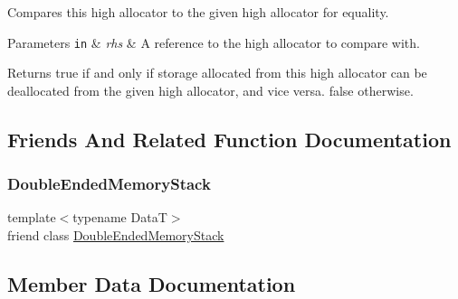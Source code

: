 Compares this high allocator to the given high allocator for equality.


\begin{DoxyParams}[1]{Parameters}
\mbox{\tt in}  & {\em rhs} & A reference to the high allocator to compare with. \\
\hline
\end{DoxyParams}
\begin{DoxyReturn}{Returns}
{\ttfamily true} if and only if storage allocated from this high allocator can be deallocated from the given high allocator, and vice versa. {\ttfamily false} otherwise. 
\end{DoxyReturn}


\subsection{Friends And Related Function Documentation}
\hypertarget{structmage_1_1_double_ended_memory_stack_1_1_high_allocator_a10ae729d55b8c0017057250445835680}{}\label{structmage_1_1_double_ended_memory_stack_1_1_high_allocator_a10ae729d55b8c0017057250445835680} 
\subsubsection{\texorpdfstring{Double\+Ended\+Memory\+Stack}{DoubleEndedMemoryStack}}
{\footnotesize\ttfamily template$<$typename DataT$>$ \\
friend class \hyperlink{classmage_1_1_double_ended_memory_stack}{Double\+Ended\+Memory\+Stack}\hspace{0.3cm}{\ttfamily [friend]}}



\subsection{Member Data Documentation}
\hypertarget{structmage_1_1_double_ended_memory_stack_1_1_high_allocator_afb9b7e67c0af8061cda859426a1f929b}{}\label{structmage_1_1_double_ended_memory_stack_1_1_high_allocator_afb9b7e67c0af8061cda859426a1f929b} 
